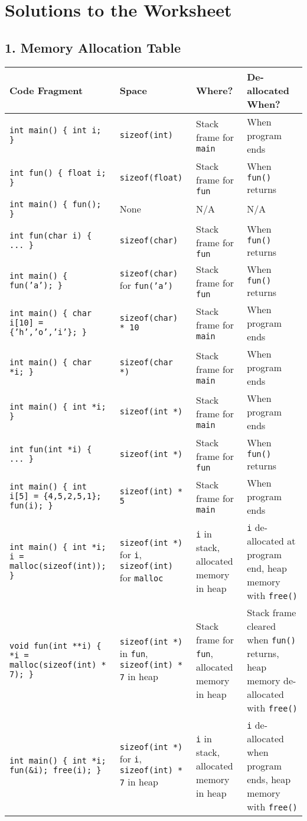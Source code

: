 \documentclass[12pt]{article}
\begin{document}
\section*{Solutions to the Worksheet}

\subsection*{1. Memory Allocation Table}
\begin{tabular}{|p{5cm}|p{3cm}|p{3cm}|p{3cm}|}
\hline
\textbf{Code Fragment} & \textbf{Space} & \textbf{Where?} & \textbf{De-allocated When?} \\
\hline
\texttt{int main() \{ int i; \}} & \texttt{sizeof(int)} & Stack frame for \texttt{main} & When program ends \\
\hline
\texttt{int fun() \{ float i; \}} & \texttt{sizeof(float)} & Stack frame for \texttt{fun} & When \texttt{fun()} returns \\
\hline
\texttt{int main() \{ fun(); \}} & None & N/A & N/A \\
\hline
\texttt{int fun(char i) \{ ... \}} & \texttt{sizeof(char)} & Stack frame for \texttt{fun} & When \texttt{fun()} returns \\
\hline
\texttt{int main() \{ fun('a'); \}} & \texttt{sizeof(char)} for \texttt{fun('a')} & Stack frame for \texttt{fun} & When \texttt{fun()} returns \\
\hline
\texttt{int main() \{ char i[10] = \{'h','o','i'\}; \}} & \texttt{sizeof(char) * 10} & Stack frame for \texttt{main} & When program ends \\
\hline
\texttt{int main() \{ char *i; \}} & \texttt{sizeof(char *)} & Stack frame for \texttt{main} & When program ends \\
\hline
\texttt{int main() \{ int *i; \}} & \texttt{sizeof(int *)} & Stack frame for \texttt{main} & When program ends \\
\hline
\texttt{int fun(int *i) \{ ... \}} & \texttt{sizeof(int *)} & Stack frame for \texttt{fun} & When \texttt{fun()} returns \\
\hline
\texttt{int main() \{ int i[5] = \{4,5,2,5,1\}; fun(i); \}} & \texttt{sizeof(int) * 5} & Stack frame for \texttt{main} & When program ends \\
\hline
\texttt{int main() \{ int *i; i = malloc(sizeof(int)); \}} & \texttt{sizeof(int *)} for \texttt{i}, \texttt{sizeof(int)} for \texttt{malloc} & \texttt{i} in stack, allocated memory in heap & \texttt{i} de-allocated at program end, heap memory with \texttt{free()} \\
\hline
\texttt{void fun(int **i) \{ *i = malloc(sizeof(int) * 7); \}} & \texttt{sizeof(int *)} in \texttt{fun}, \texttt{sizeof(int) * 7} in heap & Stack frame for \texttt{fun}, allocated memory in heap & Stack frame cleared when \texttt{fun()} returns, heap memory de-allocated with \texttt{free()} \\
\hline
\texttt{int main() \{ int *i; fun(\&i); free(i); \}} & \texttt{sizeof(int *)} for \texttt{i}, \texttt{sizeof(int) * 7} in heap & \texttt{i} in stack, allocated memory in heap & \texttt{i} de-allocated when program ends, heap memory with \texttt{free()} \\
\hline
\end{tabular}
\end{document}
